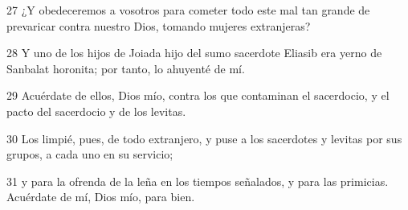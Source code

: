 \par 27 ¿Y obedeceremos a vosotros para cometer todo este mal tan grande de prevaricar contra nuestro Dios, tomando mujeres extranjeras?
\par 28 Y uno de los hijos de Joiada hijo del sumo sacerdote Eliasib era yerno de Sanbalat horonita; por tanto, lo ahuyenté de mí.
\par 29 Acuérdate de ellos, Dios mío, contra los que contaminan el sacerdocio, y el pacto del sacerdocio y de los levitas.
\par 30 Los limpié, pues, de todo extranjero, y puse a los sacerdotes y levitas por sus grupos, a cada uno en su servicio;
\par 31 y para la ofrenda de la leña en los tiempos señalados, y para las primicias. Acuérdate de mí, Dios mío, para bien.

